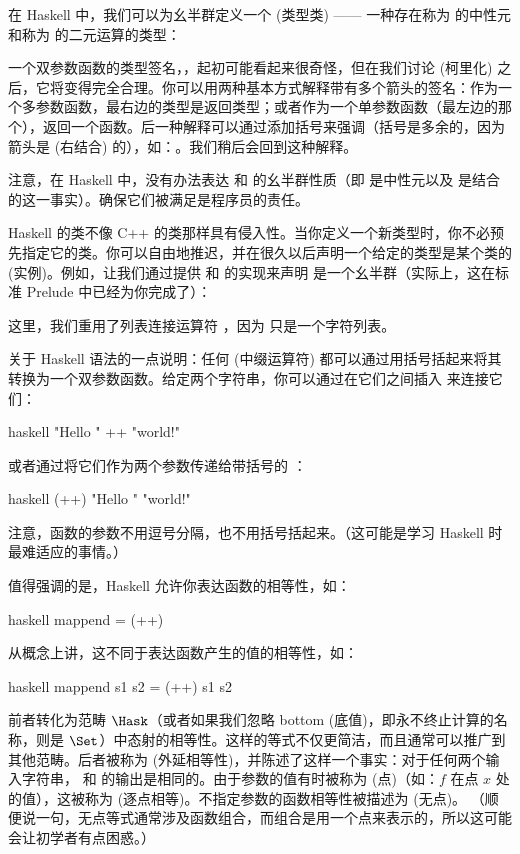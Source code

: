 在 Haskell 中，我们可以为幺半群定义一个  (类型类) —— 一种存在称为  的中性元和称为  的二元运算的类型：

一个双参数函数的类型签名，，起初可能看起来很奇怪，但在我们讨论  (柯里化) 之后，它将变得完全合理。你可以用两种基本方式解释带有多个箭头的签名：作为一个多参数函数，最右边的类型是返回类型；或者作为一个单参数函数（最左边的那个），返回一个函数。后一种解释可以通过添加括号来强调（括号是多余的，因为箭头是  (右结合) 的），如：。我们稍后会回到这种解释。

注意，在 Haskell 中，没有办法表达  和  的幺半群性质（即  是中性元以及  是结合的这一事实）。确保它们被满足是程序员的责任。

Haskell 的类不像 C++ 的类那样具有侵入性。当你定义一个新类型时，你不必预先指定它的类。你可以自由地推迟，并在很久以后声明一个给定的类型是某个类的  (实例)。例如，让我们通过提供  和  的实现来声明  是一个幺半群（实际上，这在标准 Prelude 中已经为你完成了）：

这里，我们重用了列表连接运算符 \code{(++)}，因为  只是一个字符列表。

关于 Haskell 语法的一点说明：任何  (中缀运算符) 都可以通过用括号括起来将其转换为一个双参数函数。给定两个字符串，你可以通过在它们之间插入 \code{++} 来连接它们：

\begin{snip}{haskell}
"Hello " ++ "world!"
\end{snip}
或者通过将它们作为两个参数传递给带括号的 \code{(++)}：

\begin{snip}{haskell}
(++) "Hello " "world!"
\end{snip}
注意，函数的参数不用逗号分隔，也不用括号括起来。（这可能是学习 Haskell 时最难适应的事情。）

值得强调的是，Haskell 允许你表达函数的相等性，如：

\begin{snip}{haskell}
mappend = (++)
\end{snip}
从概念上讲，这不同于表达函数产生的值的相等性，如：

\begin{snip}{haskell}
mappend s1 s2 = (++) s1 s2
\end{snip}
前者转化为范畴 $\Hask$（或者如果我们忽略 bottom (底值)，即永不终止计算的名称，则是 $\Set$）中态射的相等性。这样的等式不仅更简洁，而且通常可以推广到其他范畴。后者被称为  (外延相等性)，并陈述了这样一个事实：对于任何两个输入字符串， 和 \code{(++)} 的输出是相同的。由于参数的值有时被称为  (点)（如：$f$ 在点 $x$ 处的值），这被称为  (逐点相等)。不指定参数的函数相等性被描述为  (无点)。 （顺便说一句，无点等式通常涉及函数组合，而组合是用一个点来表示的，所以这可能会让初学者有点困惑。）

